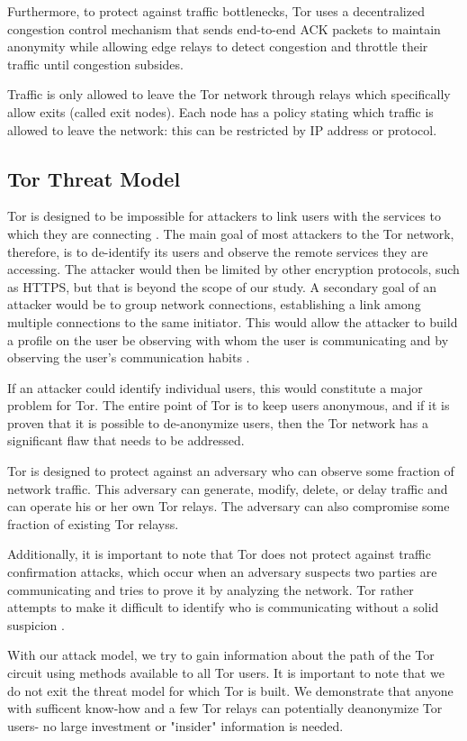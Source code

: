 \documentclass[12pt,journal]{IEEEtran}
\begin{document}
\par
Furthermore, to protect against traffic bottlenecks, Tor uses a decentralized congestion control mechanism that sends end-to-end ACK packets to maintain anonymity while allowing edge relays to detect congestion and throttle their traffic until congestion subsides.
\par
Traffic is only allowed to leave the Tor network through relays which specifically allow exits (called exit nodes). Each node has a policy stating which traffic is allowed to leave the network: this can be restricted by IP address or protocol. \cite{Dingledine:2004:TSO:1251375.1251396}

\subsection{Tor Threat Model}
Tor is designed to be impossible for attackers to link users with the services to which they are connecting \cite{Dingledine:2004:TSO:1251375.1251396}. The main goal of most attackers to the Tor network, therefore, is to de-identify its users and observe the remote services they are accessing. The attacker would then be limited by other encryption protocols, such as HTTPS, but that is beyond the scope of our study. A secondary goal of an attacker would be to group network connections, establishing a link among multiple connections to the same initiator. This would allow the attacker to build a profile on the user be observing with whom the user is communicating and by observing the user's communication habits \cite{Murdoch:2005:LTA:1058433.1059390}.
\par
If an attacker could identify individual users, this would constitute a major problem for Tor. The entire point of Tor is to keep users anonymous, and if it is proven that it is possible to de-anonymize users, then the Tor network has a significant flaw that needs to be addressed.
\par
Tor is designed to protect against an adversary who can observe some fraction of network traffic. This adversary can generate, modify, delete, or delay traffic and can operate his or her own Tor relays. The adversary can also compromise some fraction of existing Tor relayss\cite{Dingledine:2004:TSO:1251375.1251396}.
\par
Additionally, it is important to note that Tor does not protect against traffic confirmation attacks, which occur when an adversary suspects two parties are communicating and tries to prove it by analyzing the network. Tor rather attempts to make it difficult to identify who is communicating without a solid suspicion \cite{Murdoch:2005:LTA:1058433.1059390}.
\par
With our attack model, we try to gain information about the path of the Tor circuit using methods available to all Tor users. It is important to note that we do not exit the threat model for which Tor is built. We demonstrate that anyone with sufficent know-how and a few Tor relays can potentially deanonymize Tor users- no large investment or "insider" information is needed.
\end{document}
